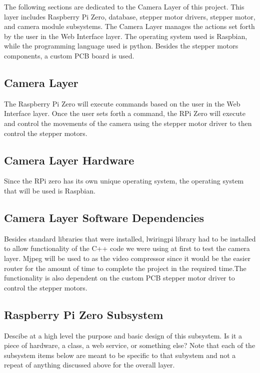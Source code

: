The following sections are dedicated to the Camera Layer of this project. This layer includes Raspberry Pi Zero, database, stepper motor drivers, stepper motor, and camera module subsystems. The Camera Layer manages the actions set forth by the user in the Web Interface layer. The operating system used is Raspbian, while the programming language used is python. Besides the stepper motors components, a custom PCB board is used.

\subsection{Camera Layer}
The Raspberry Pi Zero will execute commands based on the user in the Web Interface layer. Once the user sets forth a command, the RPi Zero will execute and control the movements of the camera using the stepper motor driver to then control the stepper motors.

\subsection{Camera Layer Hardware}
Since the RPi zero has its own unique operating system, the operating system that will be used is Raspbian. 

\subsection{Camera Layer Software Dependencies}
Besides standard libraries that were installed, lwiringpi library had to be installed to allow functionality of the C++ code we were using at first to test the camera layer. Mjpeg will be used to as the video compressor since it would be the easier router for the amount of time to complete the project in the required time.The functionality is also dependent on the custom PCB stepper motor driver to control the stepper motors.


\subsection{Raspberry Pi Zero Subsystem}
Descibe at a high level the purpose and basic design of this subsystem. Is it a piece of hardware, a class, a web service, or something else? Note that each of the subsystem items below are meant to be specific to that subystem and not a repeat of anything discussed above for the overall layer.

